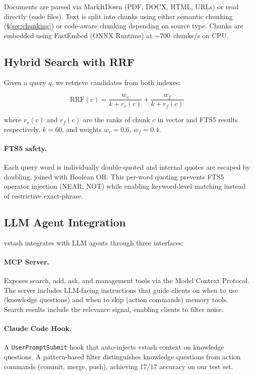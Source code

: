 \documentclass[11pt,a4paper]{article}
\begin{document}
Documents are parsed via MarkItDown (PDF, DOCX, HTML, URLs) or read
directly (code files).  Text is split into chunks using either
semantic chunking (\S\ref{sec:chunking}) or code-aware chunking
depending on source type.  Chunks are embedded using FastEmbed
(ONNX Runtime) at \(\sim\)700~chunks/s on CPU.

\subsection{Hybrid Search with RRF}
\label{sec:rrf}

Given a query $q$, we retrieve candidates from both indexes:

\begin{equation}
  \text{RRF}(c) = \frac{w_v}{k + r_v(c)} + \frac{w_f}{k + r_f(c)}
  \label{eq:rrf}
\end{equation}

\noindent where $r_v(c)$ and $r_f(c)$ are the ranks of chunk $c$ in
vector and FTS5 results respectively, $k = 60$, and weights
$w_v = 0.6$, $w_f = 0.4$.

\paragraph{FTS5 safety.}  Each query word is individually double-quoted
and internal quotes are escaped by doubling, joined with Boolean OR.
This per-word quoting prevents FTS5 operator injection (NEAR, NOT)
while enabling keyword-level matching instead of restrictive exact-phrase.

\subsection{LLM Agent Integration}
\label{sec:integration}

vstash integrates with LLM agents through three interfaces:

\paragraph{MCP Server.}  Exposes search, add, ask, and management
tools via the Model Context Protocol.  The server includes
LLM-facing instructions that guide clients on when to use (knowledge
questions) and when to skip (action commands) memory tools.  Search
results include the relevance signal, enabling clients to filter
noise.

\paragraph{Claude Code Hook.}  A \texttt{UserPromptSubmit} hook that
auto-injects vstash context on knowledge questions.  A pattern-based
filter distinguishes knowledge questions from action commands
(commit, merge, push), achieving 17/17 accuracy on our test set.
\end{document}
